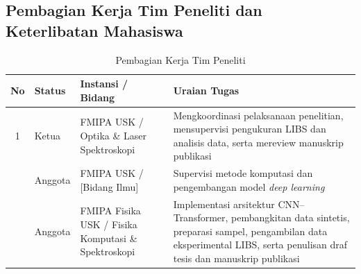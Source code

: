 \documentclass[12pt, a4paper]{article}
\begin{document}
\subsection{Pembagian Kerja Tim Peneliti dan Keterlibatan Mahasiswa}

\begin{table}[htbp]
\centering
\caption{Pembagian Kerja Tim Peneliti}
\label{tab:tim}
\small
\begin{tabular}{clp{3.5cm}p{6cm}}
\toprule
\textbf{No} & \textbf{Status} & \textbf{Instansi / Bidang} & \textbf{Uraian Tugas} \\
\midrule
1 & Ketua  & FMIPA USK / Optika \& Laser Spektroskopi & Mengkoordinasi pelaksanaan penelitian, mensupervisi pengukuran LIBS dan analisis data, serta mereview manuskrip publikasi \\
\addlinespace
2 & Anggota & FMIPA USK / [Bidang Ilmu] & Supervisi metode komputasi dan pengembangan model \textit{deep learning} \\
\addlinespace
3 & Anggota & FMIPA Fisika USK / Fisika Komputasi \& Spektroskopi & Implementasi arsitektur CNN--Transformer, pembangkitan data sintetis, preparasi sampel, pengambilan data eksperimental LIBS, serta penulisan draf tesis dan manuskrip publikasi \\
\bottomrule
\end{tabular}
\end{table}
\end{document}
